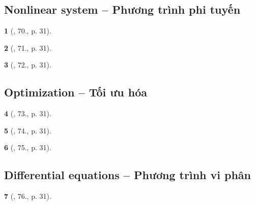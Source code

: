 \documentclass{article}
\newtheorem{baitoan}{}
\begin{document}
\subsection{Nonlinear system -- Phương trình phi tuyến}

\begin{baitoan}[\cite{Doanh_Tuan_Pascal}, 70., p. 31]
	
\end{baitoan}

\begin{baitoan}[\cite{Doanh_Tuan_Pascal}, 71., p. 31]
	
\end{baitoan}

\begin{baitoan}[\cite{Doanh_Tuan_Pascal}, 72., p. 31]
	
\end{baitoan}


\subsection{Optimization -- Tối ưu hóa}

\begin{baitoan}[\cite{Doanh_Tuan_Pascal}, 73., p. 31]
	
\end{baitoan}

\begin{baitoan}[\cite{Doanh_Tuan_Pascal}, 74., p. 31]
	
\end{baitoan}

\begin{baitoan}[\cite{Doanh_Tuan_Pascal}, 75., p. 31]
	
\end{baitoan}


\subsection{Differential equations -- Phương trình vi phân}

\begin{baitoan}[\cite{Doanh_Tuan_Pascal}, 76., p. 31]
	
\end{baitoan}
\end{document}
